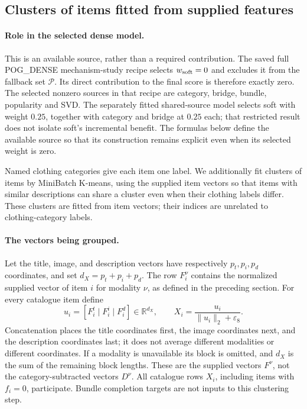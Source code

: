 \documentclass[11pt,a4paper]{article}
\numberwithin{equation}{section}
\begin{document}
\subsection{Clusters of items fitted from supplied features}
\paragraph{Role in the selected dense model.}
This is an available source, rather than a required contribution. The saved
full POG\_DENSE mechanism-study recipe selects $w_{\rm soft}=0$ and excludes
it from the fallback set $\mathcal P$. Its direct contribution to the final
score is therefore exactly zero. The selected nonzero sources in that recipe
are category, bridge, bundle, popularity and SVD. The separately fitted
shared-source model selects soft with weight $0.25$, together with category
and bridge at $0.25$ each; that restricted result does not isolate soft's
incremental benefit. The formulas below define the available source so that
its construction remains explicit even when its selected weight is zero.

Named clothing categories give each item one label. We additionally fit clusters of items by MiniBatch K-means, using
the supplied item vectors so that items with similar descriptions
can share a cluster even when their clothing labels differ. These clusters are
fitted from item vectors; their indices are unrelated to clothing-category labels.

\paragraph{The vectors being grouped.}
Let the title, image, and description vectors have respectively $p_t,p_i,p_d$
coordinates, and set $d_X=p_t+p_i+p_d$. The row $F_i^\nu$ contains the normalized
supplied vector of item $i$ for modality $\nu$, as defined in the preceding section.
For every catalogue item define
\begin{equation}\label{groupinput}
 u_i=[F_i^t\mid F_i^i\mid F_i^d]\in\mathbb R^{d_X},\qquad
 X_i=\frac{u_i}{\lVert u_i\rVert_2+\varepsilon_8}.
\end{equation}
Concatenation places the title coordinates first, the image coordinates next,
and the description coordinates last; it does not average different modalities
or different coordinates. If a modality is unavailable its block is omitted,
and $d_X$ is the sum of the remaining block lengths. These are the supplied vectors
$F^\nu$, not the category-subtracted vectors $D^\nu$. All catalogue rows $X_i$,
including items with $f_i=0$, participate. Bundle completion targets are not inputs
to this clustering step.
\end{document}
